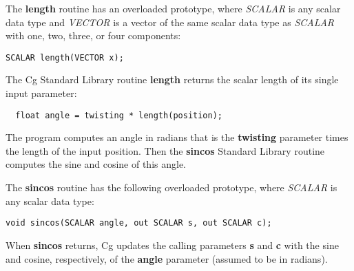 \documentclass[../main.tex]{subfiles}
\begin{document}
The \textbf{length} routine has an overloaded prototype, where \textit{SCALAR} is any scalar data type and \textit{VECTOR} is a vector of the same scalar data type as \textit{SCALAR} with one, two, three, or four components:

\FloatBarrier
\begin{lstlisting}
SCALAR length(VECTOR x);
\end{lstlisting}
\FloatBarrier

The Cg Standard Library routine \textbf{length} returns the scalar length of its single input parameter:

\FloatBarrier
\begin{lstlisting}
  float angle = twisting * length(position);
\end{lstlisting}
\FloatBarrier

The program computes an angle in radians that is the \textbf{twisting} parameter times the length of the input position. Then the \textbf{sincos} Standard Library routine computes the sine and cosine of this angle.

The \textbf{sincos} routine has the following overloaded prototype, where \textit{SCALAR} is any scalar data type:

\FloatBarrier
\begin{lstlisting}
void sincos(SCALAR angle, out SCALAR s, out SCALAR c);
\end{lstlisting}
\FloatBarrier

When \textbf{sincos} returns, Cg updates the calling parameters \textbf{s} and \textbf{c} with the sine and cosine, respectively, of the \textbf{angle} parameter (assumed to be in radians).
\end{document}
